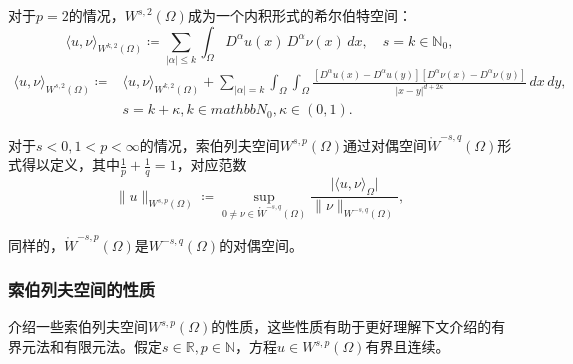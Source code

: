 对于$p=2$的情况，$W^{s,2}(\Omega)$成为一个内积形式的希尔伯特空间：
\begin{equation}
  \label{eq:sobolev-slobodeckij-innerp-k}
  \langle u,\nu\rangle_{W^{k,2}(\Omega)} \coloneqq \sum_{\left| \alpha \right| \le k} \int_{\Omega} D^{\alpha}u(x) \, D^{\alpha}\nu(x) \, dx, \quad s=k\in \mathbb{N}_0,
\end{equation}
\begin{equation}
  \label{eq:sobolev-slobodeckij-innerp-s}
  \begin{split}
    \langle u,\nu\rangle_{W^{s,2}(\Omega)} \coloneqq & \langle u,\nu\rangle_{W^{k,2}(\Omega)} +
    \sum_{\left| \alpha \right  | = k} \int_{\Omega} \int_{\Omega} \frac{
    \left[D^{\alpha} u(x) - D^{\alpha} u(y) \right]
    \left[D^{\alpha} \nu(x) - D^{\alpha} \nu(y) \right]
    }{
    \left| x - y \right|^{d + 2 \kappa}
    } \, dx \, dy, \\
    & s=k+\kappa, k\in mathbb{N}_0, \kappa \in (0,1).
  \end{split}
\end{equation}

对于$s < 0, 1<p<\infty$的情况，索伯列夫空间$W^{s,p}(\Omega)$通过对偶空间$\mathring{W}^{-s,q}(\Omega)$形式得以定义，其中$\frac{1}{p} + \frac{1}{q} = 1$，对应范数
\begin{equation*}
  \| u \| _{W^{s,p}(\Omega)} \coloneqq \sup_{0 \neq \nu \in \mathring{W}^{-s,q}(\Omega)} \frac{
  \big| \langle u,\nu \rangle_{\Omega} \big|
  }{
  \| \nu \|_{W^{-s,q}(\Omega)}
  },
\end{equation*}

同样的，$\mathring{W}^{-s,p}(\Omega)$是$W^{-s,q}(\Omega)$的对偶空间。

\subsubsection{索伯列夫空间的性质}
介绍一些索伯列夫空间$W^{s,p}(\Omega)$的性质，这些性质有助于更好理解下文介绍的有界元法和有限元法。假定$s \in \mathbb{R}, p\in \mathbb{N}$，方程$u\in W^{s,p}(\Omega)$有界且连续。

